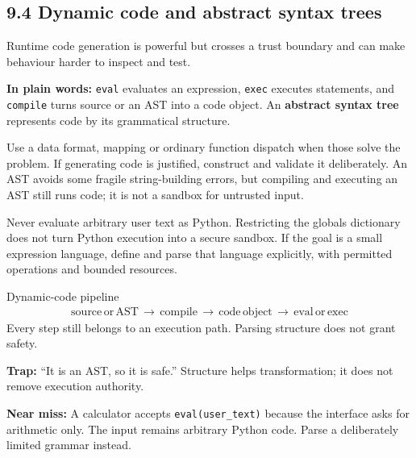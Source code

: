 \documentclass[11pt]{article}
\begin{document}
\begin{keepsection}
\section{9.4 Dynamic code and abstract syntax trees}

Runtime code generation is powerful but crosses a trust boundary and can make behaviour harder to inspect and test.

\begin{plainbox}\textbf{In plain words:} \texttt{eval} evaluates an expression, \texttt{exec} executes statements, and \texttt{compile} turns source or an AST into a code object. An \textbf{abstract syntax tree} represents code by its grammatical structure.\end{plainbox}

Use a data format, mapping or ordinary function dispatch when those solve the problem. If generating code is justified, construct and validate it deliberately. An AST avoids some fragile string-building errors, but compiling and executing an AST still runs code; it is not a sandbox for untrusted input.

Never evaluate arbitrary user text as Python. Restricting the globals dictionary does not turn Python execution into a secure sandbox. If the goal is a small expression language, define and parse that language explicitly, with permitted operations and bounded resources.

\begin{equationcard}{Dynamic-code pipeline}
\[ \begin{gathered} \text{source}\, \text{or}\, \text{AST}\, \to \, \text{compile}\, \to \, \text{code}\, \text{object}\, \to \, \text{eval}\, \text{or}\, \text{exec} \end{gathered} \]
{\small Every step still belongs to an execution path. Parsing structure does not grant safety.}
\end{equationcard}

\begin{notebox}\textbf{Trap:} “It is an AST, so it is safe.” Structure helps transformation; it does not remove execution authority.\end{notebox}

\begin{notebox}\textbf{Near miss:} A calculator accepts \texttt{eval(user\_text)} because the interface asks for arithmetic only. The input remains arbitrary Python code. Parse a deliberately limited grammar instead.\end{notebox}


\end{keepsection}
\end{document}
